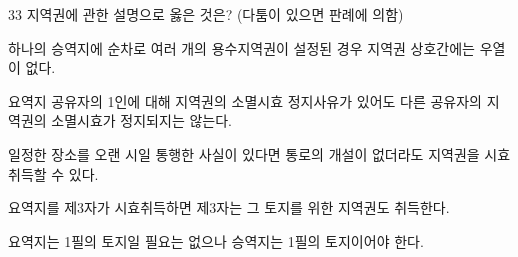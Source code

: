 \begin{question}{33}
지역권에 관한 설명으로 옳은 것은? (다툼이 있으면 판례에 의함)
\begin{choices}
  \item 하나의 승역지에 순차로 여러 개의 용수지역권이 설정된 경우 지역권 상호간에는 우열이 없다.
  \item 요역지 공유자의 1인에 대해 지역권의 소멸시효 정지사유가 있어도 다른 공유자의 지역권의 소멸시효가 정지되지는 않는다.
  \item 일정한 장소를 오랜 시일 통행한 사실이 있다면 통로의 개설이 없더라도 지역권을 시효취득할 수 있다.
  \item 요역지를 제3자가 시효취득하면 제3자는 그 토지를 위한 지역권도 취득한다.
  \item 요역지는 1필의 토지일 필요는 없으나 승역지는 1필의 토지이어야 한다.
\end{choices}
\end{question}
